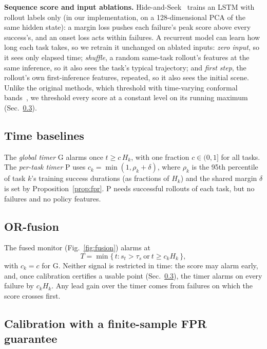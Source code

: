 \documentclass[conference]{IEEEtran}
\begin{document}
\textbf{Sequence score and input ablations.} Hide-and-Seek~\cite{park2026hideseek} trains an LSTM
with rollout labels only (in our implementation, on a 128-dimensional PCA of the same hidden
state): a margin loss pushes
each failure's peak score above every success's, and an onset loss acts within failures. A
recurrent model can learn how long each task takes, so we retrain it unchanged on ablated inputs:
\emph{zero input}, so it sees only elapsed time; \emph{shuffle}, a random same-task rollout's
features at the same inference, so it also sees the task's typical trajectory; and \emph{first
step}, the rollout's own first-inference features, repeated, so it also sees the initial scene.
Unlike the original
methods, which threshold with time-varying conformal bands~\cite{gu2025safe,park2026hideseek}, we
threshold every score at a constant level on its running maximum (Sec.~\ref{sec:guarantee}).

\subsection{Time baselines}

The \emph{global timer} G alarms once $t \ge c\,H_k$, with one fraction $c \in (0, 1]$ for all
tasks. The \emph{per-task timer} P uses $c_k = \min(1, \rho_k + \delta)$, where $\rho_k$ is the
95th percentile of task $k$'s training success durations (as fractions of $H_k$) and the shared
margin $\delta$ is set by Proposition~\ref{prop:fpr}. P needs successful rollouts of each task,
but no failures and no policy features.

\subsection{OR-fusion}


The fused monitor (Fig.~\ref{fig:fusion}) alarms at
\begin{equation}
  T = \min\{\, t : s_t > \tau_s \ \text{or}\ t \ge c_k H_k \,\},
\end{equation}
with $c_k = c$ for G. Neither signal is restricted in time: the score may alarm early, and,
once calibration certifies a usable point (Sec.~\ref{sec:guarantee}), the timer alarms on every
failure by $c_k H_k$. Any lead
gain over the timer comes from failures on which the score crosses first.

\subsection{Calibration with a finite-sample FPR guarantee}
\label{sec:guarantee}
\end{document}
